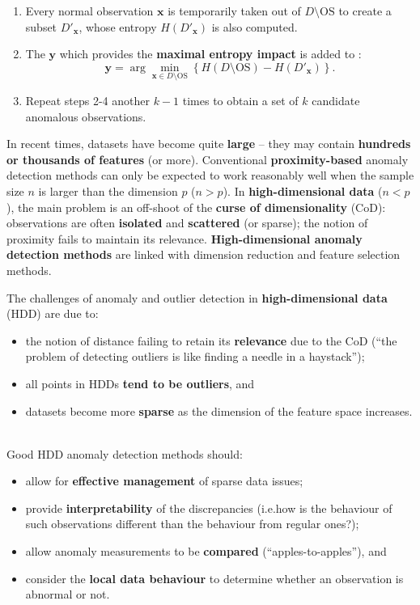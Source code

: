 \documentclass[20pt,landscape,footrule,headrule]{foils}
\newcommand{\newl}{\newline\newline}
\def\fh{\foilhead}
\begin{document}
{{\begin{enumerate}
\item Every normal observation $\mathbf{x}$ is temporarily taken out of $D\setminus \text{OS}$ to create a subset $D'_{\mathbf{x}}$, whose entropy $H(D'_{\mathbf{x}})$ is also computed.
\item The $\mathbf{y}$ which provides the \textbf{maximal entropy impact} is added to : $$\mathbf{y}=\arg\min_{\mathbf{x}\in D\setminus \text{OS}} \left\{H(D\setminus \text{OS})-H(D'_{\mathbf{x}})\right\}.$$
\item Repeat steps 2-4 another $k-1$ times to obtain a set  of $k$ candidate anomalous observations.
\end{enumerate}

\fh{\textcolor{darkestgreen}{6.4 -- Anomalies in High-Dimensional Datasets}} \label{6.4}
\noindent In recent times, datasets have become quite \textbf{large} -- they may contain \textbf{hundreds or thousands of features} (or more).
\newl Conventional \textbf{proximity-based} anomaly detection methods can only be expected to work reasonably well when the sample size $n$ is larger than the dimension $p$ ($n>p$). 
\newl
In \textbf{high-dimensional data} ($n<p$), the main problem is an off-shoot of the \textbf{curse of dimensionality} (CoD):  observations are often \textbf{isolated} and \textbf{scattered} (or sparse); the notion of proximity fails to maintain its relevance. \newl \textbf{High-dimensional anomaly detection methods} are linked with dimension reduction and feature selection methods. 

\fh{6.4.1 -- Definitions and Challenges} \label{6.4.1}
\noindent The challenges of anomaly and outlier detection in \textbf{high-dimensional data} (HDD) are due to:
\begin{itemize}
\item the notion of distance failing to retain its \textbf{relevance} due to the CoD (``the problem of detecting outliers is like finding a needle in a haystack'');
\item all points in HDDs \textbf{tend to be  outliers}, and 
\item datasets become more \textbf{sparse} as the dimension of the feature space increases.
\end{itemize}

\newpage\ \\ \noindent Good HDD anomaly detection methods should:
\begin{itemize}
\item allow for \textbf{effective management} of sparse data issues;
\item provide \textbf{interpretability} of the discrepancies (i.e.\@ how is the behaviour of such observations different than the behaviour from regular ones?);
\item allow anomaly measurements to be \textbf{compared} (``apples-to-apples''), and 
\item consider the \textbf{local data behaviour} to determine whether an observation is abnormal or not.
\end{itemize}

}}
\end{document}
